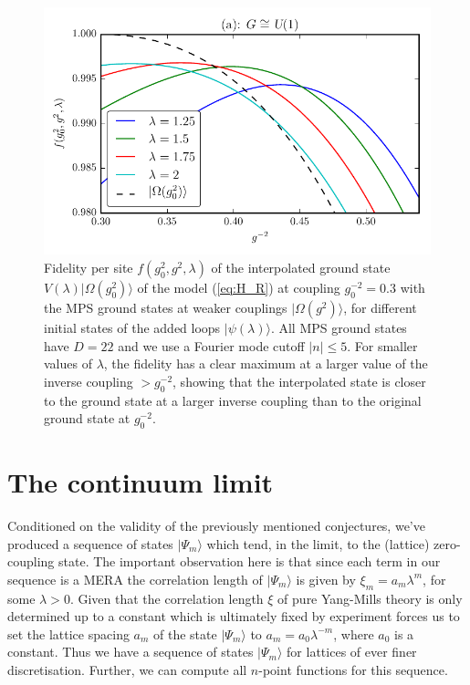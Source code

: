 \documentclass[twocolumn,lengthcheck,superscriptaddress]{revtex4-1}
\theoremstyle{definition}
\theoremstyle{remark}
\begin{document}
\begin{figure}
  \includegraphics[width=\linewidth]{interpfidu1.pdf}
  \caption{\label{fig:interp-fid-u1} Fidelity per site
    $f(g_0^2, g^2, \lambda)$ of the interpolated ground state
    $V(\lambda) |\Omega(g_0^2)\rangle$ of the model (\ref{eq:H_R}) at
    coupling $g_0^{-2} = 0.3$ with the MPS ground states at weaker
    couplings $|\Omega(g^2)\rangle$, for different initial states of
    the added loops $|\psi(\lambda)\rangle$. All MPS ground states
    have $D=22$ and we use a Fourier mode cutoff $|n| \le 5$.
    For smaller values of $\lambda$, the fidelity has a clear
    maximum at a larger value of the inverse coupling $> g_0^{-2}$, showing
    that the interpolated state is closer to the ground state at a larger
    inverse coupling than to the original ground state at $g_0^{-2}$.}
\end{figure}

\section{The continuum limit}
Conditioned on the validity of the previously mentioned conjectures, we've produced a sequence of states $|\Psi_m\rangle$ which tend, in the limit, to the (lattice) zero-coupling state. The important observation here is that since each term in our sequence is a MERA the correlation length of $|\Psi_m\rangle$ is given by $\xi_m = a_m\lambda^m$, for some $\lambda>0$.  Given that the correlation length $\xi$ of pure Yang-Mills theory is only determined up to a constant which is ultimately fixed by experiment forces us to set the lattice spacing $a_m$ of the state $|\Psi_m\rangle$ to $a_m = a_0\lambda^{-m}$, where $a_0$ is a constant. Thus we have a sequence of states $|\Psi_m\rangle$ for lattices of ever finer discretisation. Further, we can compute all $n$-point functions for this sequence. 
\end{document}
